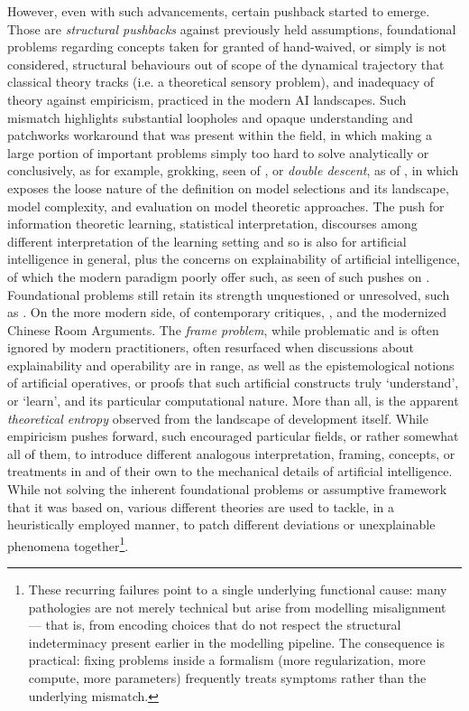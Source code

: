 However, even with such advancements, certain pushback started to emerge. Those are \textit{structural pushbacks} against previously held assumptions, foundational problems regarding concepts taken for granted of hand-waived, or simply is not considered, structural behaviours out of scope of the dynamical trajectory that classical theory tracks (i.e. a theoretical sensory problem), and inadequacy of theory against empiricism, practiced in the modern AI landscapes. Such mismatch highlights substantial loopholes and opaque understanding and patchworks workaround that was present within the field, in which making a large portion of important problems simply too hard to solve analytically or conclusively, as for example, grokking, seen of \cite{power2022grokkinggeneralizationoverfittingsmall}, or \textit{double descent}, as of \cite{belkin_reconciling_2019-1,nakkiran_deep_2019}, in which exposes the loose nature of the definition on model selections and its landscape, model complexity, and evaluation on model theoretic approaches. The push for information theoretic learning, statistical interpretation, discourses among different interpretation of the learning setting and so is also for artificial intelligence in general, plus the concerns on explainability of artificial intelligence, of which the modern paradigm poorly offer such, as seen of such pushes on \cite{doshi2017towards,lipton2018mythos,ribeiro2016should,lundberg2017shap,molnar2020interpretable}
. Foundational problems still retain its strength unquestioned or unresolved, such as \cite{dreyfus1965alchemy,dreyfus1972what,dreyfus1986mind,suchman1987plans,brooks1991intelligence,searle1980minds,mccarthy1969philosophical,harnad1990symbol}. On the more modern side, of contemporary critiques, \cite{pearl2009causality,marcus2018deep,sutton2019bitter}, and the modernized Chinese Room Arguments. The \textit{frame problem}, while problematic and is often ignored by modern practitioners, often resurfaced when discussions about explainability and operability are in range, as well as the epistemological notions of artificial operatives, or proofs that such artificial constructs truly `understand', or `learn', and its particular computational nature. More than all, is the apparent \textit{theoretical entropy} observed from the landscape of development itself. While empiricism pushes forward, such encouraged particular fields, or rather somewhat all of them, to introduce different analogous interpretation, framing, concepts, or treatments in and of their own to the mechanical details of artificial intelligence. While not solving the inherent foundational problems or assumptive framework that it was based on, various different theories are used to tackle, in a heuristically employed manner, to patch different deviations or unexplainable phenomena together\footnote{These recurring failures point to a single underlying functional cause: many pathologies are not merely technical but arise from modelling misalignment — that is, from encoding choices that do not respect the structural indeterminacy present earlier in the modelling pipeline. The consequence is practical: fixing problems inside a formalism (more regularization, more compute, more parameters) frequently treats symptoms rather than the underlying mismatch.}. 

